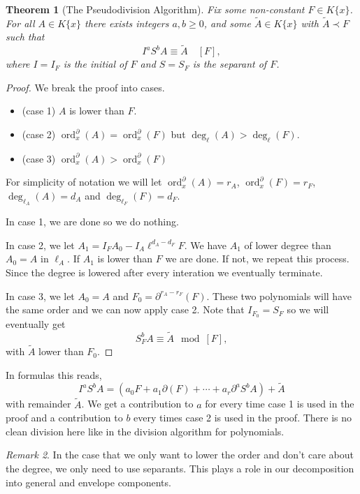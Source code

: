 \documentclass[12pt]{book}
\numberwithin{equation}{section}
\newtheorem{theorem}{Theorem}[subsection]
\theoremstyle{definition}
\theoremstyle{remark}
\newtheorem{remark}[theorem]{Remark}
\newcommand{\ord}{\operatorname{ord}}
\begin{document}
\begin{theorem}[The Pseudodivision Algorithm]\label{T:ode-pseudodivision}
	Fix some non-constant $F \in K\lbrace x \rbrace$. 
	For all $A \in K\lbrace x \rbrace$ there exists integers $a,b\geq 0$, and some $\widetilde{A}\in K\lbrace x \rbrace$ with $\widetilde{A} \prec F$ such that 
	 $$ I^a S^b A \equiv \widetilde{A} \quad [F],$$
	where $I=I_F$ is the initial of $F$ and $S=S_F$ is the separant of $F$.
\end{theorem}
\begin{proof}
	We break the proof into cases. 
	\begin{itemize}
		\item (case 1) $A$ is lower than $F$. 
		\item (case 2) $\ord^{\partial}_x(A) = \ord^{\partial}_x(F)$ but $\deg_{\ell}(A) > \deg_{\ell}(F)$.
		\item (case 3) $\ord^{\partial}_x(A)>\ord^{\partial}_x(F)$
	\end{itemize}
    For simplicity of notation we will let $\ord^{\partial}_x(A) = r_A$, $\ord^{\partial}_x(F) = r_F$, $\deg_{\ell_A}(A)=d_A$ and $\deg_{\ell_F}(F)=d_F$.
    
    In case 1, we are done so we do nothing. 
    
    In case 2, we let $A_1= I_FA_0 - I_A\ell^{d_A-d_F}F$.
    We have $A_1$ of lower degree than $A_0=A$ in $\ell_A$. 
    If $A_1$ is lower than $F$ we are done. 
    If not, we repeat this process.
    Since the degree is lowered after every interation we eventually terminate. 
    
    In case 3, we let $A_0 = A$ and $F_0=\partial^{r_A-r_F}(F)$.
    These two polynomials will have the same order and we can now apply case 2. 
    Note that $I_{F_0} = S_F$ so we will eventually get 
     $$ S_F^b A \equiv \widetilde{A} \mod [F],$$
    with $\widetilde{A}$ lower than $F_0$. 
\end{proof}

In formulas this reads,
$$ I^a S^b A = (a_0F + a_1 \partial(F) + \cdots + a_r \partial^aS^b A) + \widetilde{A}$$ 
with remainder $\widetilde{A}$. 
We get a contribution to $a$ for every time case 1 is used in the proof and a contribution to $b$ every times case 2 is used in the proof. 
There is no clean division here like in the division algorithm for polynomials. 

\begin{remark}
	In the case that we only want to lower the order and don't care about the degree, we only need to use separants. 
	This plays a role in our decomposition into general and envelope components.
\textbf{}\end{remark}
\end{document}
